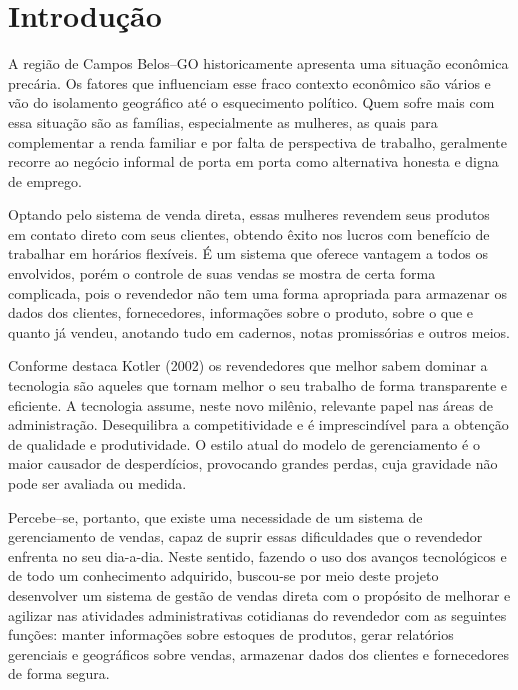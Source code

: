 \documentclass[chapter=TITLE,12pt,oneside,a4paper,english,french,sumario=tradicional,spanish,brazil,]{abntex2}
\begin{document}
\begin{SingleSpace}
\tableofcontents*
\thispagestyle{empty}
\end{SingleSpace}
\textual %

\chapter*{Introdução}
A região de Campos Belos–GO historicamente apresenta uma situação econômica precária. Os fatores que influenciam esse fraco contexto econômico são vários e vão do isolamento geográfico até o esquecimento político. Quem sofre mais com essa situação são as famílias, especialmente as mulheres, as quais para complementar a renda familiar e por falta de perspectiva de trabalho, geralmente recorre ao negócio informal de porta em porta como alternativa honesta e digna de emprego.

Optando pelo sistema de venda direta, essas mulheres revendem seus produtos em contato direto com seus clientes, obtendo êxito nos lucros com benefício de trabalhar em horários flexíveis. É um sistema que oferece vantagem a todos os envolvidos, porém o controle de suas vendas se mostra de certa forma complicada, pois o revendedor não tem uma forma apropriada para armazenar os dados dos clientes, fornecedores, informações sobre o produto, sobre o que e quanto já vendeu, anotando tudo em cadernos, notas promissórias e outros meios.

Conforme destaca Kotler (2002) os revendedores que melhor sabem dominar a tecnologia são aqueles que tornam melhor o seu trabalho de forma transparente e eficiente. A tecnologia assume, neste novo milênio, relevante papel nas áreas de administração. Desequilibra a competitividade e é imprescindível para a obtenção de qualidade e produtividade. O estilo atual do modelo de gerenciamento é o maior causador de desperdícios, provocando grandes perdas, cuja gravidade não pode ser avaliada ou medida.

Percebe–se, portanto, que existe uma necessidade de um sistema de gerenciamento de vendas, capaz de suprir essas dificuldades que o revendedor enfrenta no seu dia-a-dia. Neste sentido, fazendo o uso dos avanços tecnológicos e de todo um conhecimento adquirido, buscou-se por meio deste projeto desenvolver um sistema de gestão de vendas direta com o propósito de melhorar e agilizar nas atividades administrativas cotidianas do revendedor com as seguintes funções: manter informações sobre estoques de produtos, gerar relatórios gerenciais e geográficos sobre vendas, armazenar dados dos clientes e fornecedores de forma segura.
\end{document}
